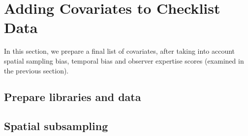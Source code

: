 \documentclass[
]{article}
\newenvironment{Shaded}{}{}
\newcommand{\CommentTok}[1]{\textcolor[rgb]{0.00,0.50,0.00}{#1}}
\newcommand{\ControlFlowTok}[1]{\textcolor[rgb]{0.00,0.00,1.00}{#1}}
\newcommand{\KeywordTok}[1]{\textcolor[rgb]{0.00,0.00,1.00}{#1}}
\newcommand{\NormalTok}[1]{#1}
\newcommand{\OperatorTok}[1]{#1}
\newcommand{\StringTok}[1]{\textcolor[rgb]{0.00,0.50,0.50}{#1}}
\begin{document}
\hypertarget{adding-covariates-to-checklist-data}{%
\section{Adding Covariates to Checklist Data}\label{adding-covariates-to-checklist-data}}

In this section, we prepare a final list of covariates, after taking into account spatial sampling bias, temporal bias and observer expertise scores (examined in the previous section).

\hypertarget{prepare-libraries-and-data}{%
\subsection{Prepare libraries and data}\label{prepare-libraries-and-data}}

\begin{Shaded}
\end{Shaded}

\hypertarget{spatial-subsampling}{%
\subsection{Spatial subsampling}\label{spatial-subsampling}}
\end{document}
